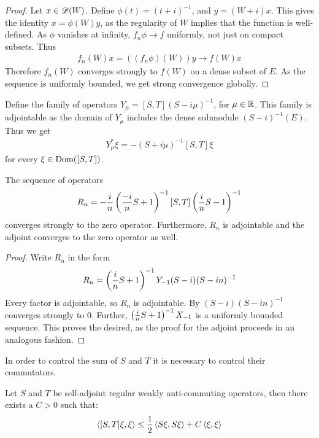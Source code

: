 \begin{proof}
	Let $x\in \mathscr{D}(W)$. Define $\phi(t)=(t+i)^{-1}$, and $y=(W+i)x$. This gives the identity $x=\phi(W)y$, as the regularity of $W$ implies that the function is well-defined. As $\phi$ vanishes at infinity, $f_n\phi\to f$ uniformly, not just on compact subsets. Thus
	\begin{align*}
		f_n(W)x=((f_n\phi)(W))y\to f(W)x
	\end{align*}
	Therefore $f_n(W)$ converges strongly to $f(W)$ on a dense subset of $E$. As the sequence is uniformly bounded, we get strong convergence globally. 
\end{proof}
Define the family of operators $Y_\mu=[S,T](S-i\mu)^{-1}$, for $\mu \in \mathbb{R}$. This family is adjointable as the domain of $Y_\mu$ includes the dense submodule $(S-i)^{-1}(E)$. Thus we get
\begin{align*}
	Y_\mu^*\xi=-(S+i\mu)^{-1}[S,T]\xi
\end{align*}
for every $\xi\in \operatorname{Dom}([S,T])$. 
\begin{lemma}\label{convergestozero1}
	The sequence of operators 
	\begin{align*}
		R_n=-\frac{i}{n}\left ( \frac{-i}{n}S+1 \right )^{-1}[S,T]\left ( \frac{i}{n}S-1 \right )^{-1}
	\end{align*}
	converges strongly to the zero operator. Furthermore, $R_n$ is adjointable and the adjoint converges to the zero operator as well.
\end{lemma}
\begin{proof}
	Write $R_n$ in the form
	\begin{align*}
		R_n=\left ( \frac{i}{n}S+1 \right )^{-1}Y_{-1}(S-i)(S-in)^{-1} 
	\end{align*}
	Every factor is adjointable, so $R_n$ is adjointable. By  $(S-i)(S-in)^{-1}$ converges strongly to 0. Further, $\left ( \frac{i}{n}S+1 \right )^{-1}X_{-1}$ is a uniformly bounded sequence. This proves the desired, as the proof for the adjoint proceeds in an analogous fashion. 
\end{proof}
In order to control the sum of $S$ and $T$ it is necessary to control their commutators. 
\begin{lemma}\label{estimatelemma1}
	Let $S$ and $T$ be self-adjoint regular weakly anti-commuting operators, then there exists a $C>0$ such that:
	\begin{align*}
		\left \langle [S,T]\xi,\xi \right \rangle\leq \frac{1}{2}\left \langle S\xi,S\xi \right \rangle+C\left \langle \xi,\xi \right \rangle
	\end{align*}
\end{lemma}
